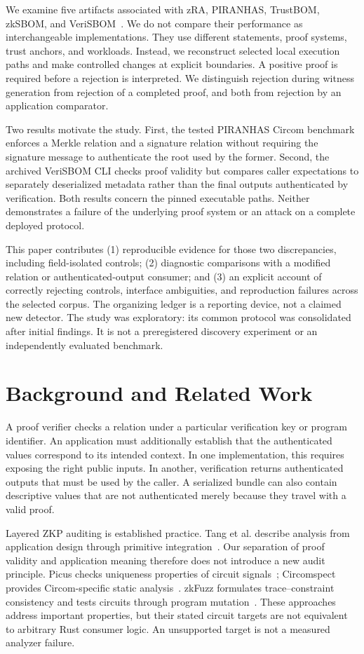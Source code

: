 \documentclass[sigconf,nonacm]{acmart}
\begin{document}
We examine five artifacts associated with zRA, PIRANHAS, TrustBOM, zkSBOM, and VeriSBOM~\cite{zra,piranhas,trustbom,zksbom,verisbom}. We do not compare their performance as interchangeable implementations. They use different statements, proof systems, trust anchors, and workloads. Instead, we reconstruct selected local execution paths and make controlled changes at explicit boundaries. A positive proof is required before a rejection is interpreted. We distinguish rejection during witness generation from rejection of a completed proof, and both from rejection by an application comparator.

Two results motivate the study. First, the tested PIRANHAS Circom benchmark enforces a Merkle relation and a signature relation without requiring the signature message to authenticate the root used by the former. Second, the archived VeriSBOM CLI checks proof validity but compares caller expectations to separately deserialized metadata rather than the final outputs authenticated by verification. Both results concern the pinned executable paths. Neither demonstrates a failure of the underlying proof system or an attack on a complete deployed protocol.

This paper contributes (1) reproducible evidence for those two discrepancies, including field-isolated controls; (2) diagnostic comparisons with a modified relation or authenticated-output consumer; and (3) an explicit account of correctly rejecting controls, interface ambiguities, and reproduction failures across the selected corpus. The organizing ledger is a reporting device, not a claimed new detector. The study was exploratory: its common protocol was consolidated after initial findings. It is not a preregistered discovery experiment or an independently evaluated benchmark.

\section{Background and Related Work}
A proof verifier checks a relation under a particular verification key or program identifier. An application must additionally establish that the authenticated values correspond to its intended context. In one implementation, this requires exposing the right public inputs. In another, verification returns authenticated outputs that must be used by the caller. A serialized bundle can also contain descriptive values that are not authenticated merely because they travel with a valid proof.

Layered ZKP auditing is established practice. Tang et al. describe analysis from application design through primitive integration~\cite{audit}. Our separation of proof validity and application meaning therefore does not introduce a new audit principle. Picus checks uniqueness properties of circuit signals~\cite{picus}; Circomspect provides Circom-specific static analysis~\cite{circomspect}. zkFuzz formulates trace--constraint consistency and tests circuits through program mutation~\cite{zkfuzz}. These approaches address important properties, but their stated circuit targets are not equivalent to arbitrary Rust consumer logic. An unsupported target is not a measured analyzer failure.
\end{document}
